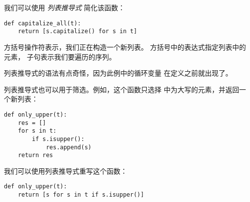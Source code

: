 
我们可以使用 {\em 列表推导式} 简化该函数：


\begin{lstlisting}
def capitalize_all(t):
    return [s.capitalize() for s in t]
\end{lstlisting}


方括号操作符表示，我们正在构造一个新列表。  
方括号中的表达式指定列表中的元素，  子句表示我们要遍历的序列。

  


列表推导式的语法有点奇怪，因为此例中的循环变量  在定义之前就出现了。


列表推导式也可以用于筛选。例如，这个函数只选择  中为大写的元素，并返回一个新列表：

  

\begin{lstlisting}
def only_upper(t):
    res = []
    for s in t:
        if s.isupper():
            res.append(s)
    return res
\end{lstlisting}


我们可以使用列表推导式重写这个函数：

\begin{lstlisting}
def only_upper(t):
    return [s for s in t if s.isupper()]
\end{lstlisting}


